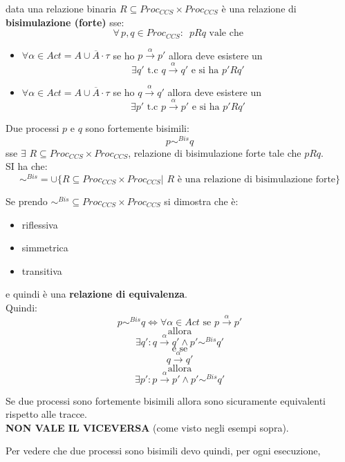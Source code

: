 \documentclass[a4paper,12pt, oneside]{book}
\begin{document}
\begin{definizione}
  data una relazione binaria $R\subseteq Proc_{CCS}\times Proc_{CCS}$ è una
  relazione di \textbf{bisimulazione (forte)} sse:
  \[\forall\,p,q\in Proc_{CCS}:\,\,\, pRq \mbox{ vale che }\]
  \begin{itemize}
    \item $\forall \alpha\in Act=A\cup \overline{A}\cdot \tau$ se ho
    $p\stackrel{\alpha}{\rightarrow}p'$ allora deve esistere un \[\exists
    q'\mbox{ t.c }q\stackrel{\alpha}{\rightarrow}q'\mbox{ e si ha }p'Rq'\]
  \item  $\forall \alpha\in Act=A\cup \overline{A}\cdot \tau$ se ho
    $q\stackrel{\alpha}{\rightarrow}q'$ allora deve esistere un \[\exists
    p'\mbox{ t.c }p\stackrel{\alpha}{\rightarrow}p'\mbox{ e si ha }p'Rq'\]
\end{itemize}
Due processi $p$ e $q$ sono fortemente bisimili:
\[p\sim^{Bis}q\]
sse $\exists\,\,R\subseteq Proc_{CCS}\times Proc_{CCS}$, relazione di
bisimulazione forte tale che $pRq$.\\
SI ha che:
\[\sim^{Bis}=\cup\{R\subseteq Proc_{CCS}\times Proc_{CCS}|\,\,R \mbox{ è una
    relazione di bisimulazione forte}\}\]
\end{definizione}
\begin{teorema}
  Se prendo $\sim^{Bis}\subseteq Proc_{CCS}\times Proc_{CCS}$ si dimostra che è:
  \begin{itemize}
    \item riflessiva
    \item simmetrica
    \item transitiva
  \end{itemize}
  e quindi è una \textbf{relazione di equivalenza}.\\
  Quindi:
  \[p\sim^{Bis}q\iff \forall\alpha\in Act \mbox{ se }
    p\stackrel{\alpha}{\rightarrow}p'\]
  \[\mbox{ allora }\]
  \[\exists q': q\stackrel{\alpha}{\rightarrow}q'\land p'\sim^{Bis}q'\]
  \[\mbox{ e se }\]
  \[q\stackrel{\alpha}{\rightarrow}q' \]
  \[\mbox{ allora }\]
  \[\exists p': p\stackrel{\alpha}{\rightarrow}p'\land p'\sim^{Bis}q'\]
  
\end{teorema}
\begin{teorema}
  Se due processi sono fortemente bisimili allora sono sicuramente equivalenti
  rispetto alle tracce. \\
  \textbf{NON VALE IL VICEVERSA} (come visto negli esempi sopra).
\end{teorema}
Per vedere che due processi sono bisimili devo quindi, per ogni esecuzione,
\end{document}
